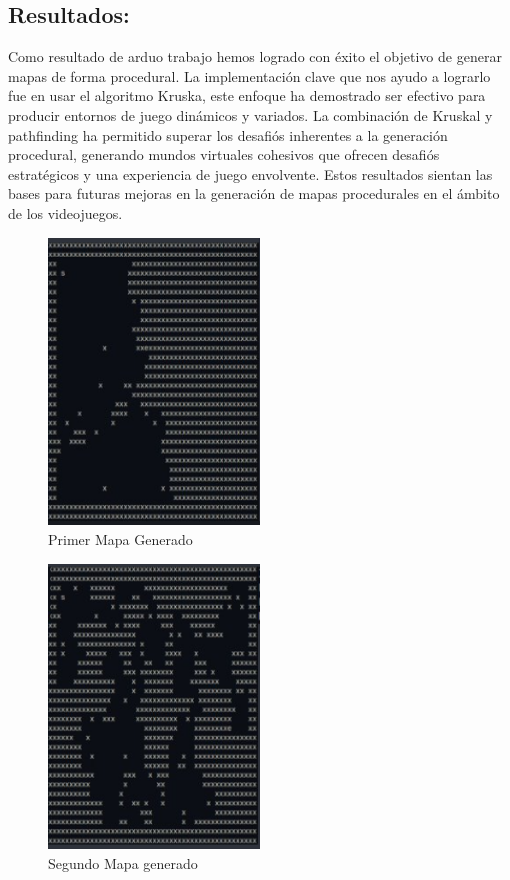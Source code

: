 \documentclass[stu, 12pt, letterpaper, donotrepeattitle, floatsintext, natbib]{apa7}
\begin{document}
\subsection{Resultados:}
Como resultado de arduo trabajo hemos logrado con éxito el objetivo de generar mapas de forma procedural. La implementación clave que nos ayudo a lograrlo fue en usar el algoritmo Kruska, este enfoque ha demostrado ser efectivo para producir entornos de juego dinámicos y variados. La combinación de Kruskal y pathfinding ha permitido superar los desafiós inherentes a la generación procedural, generando mundos virtuales cohesivos que ofrecen desafiós estratégicos y una experiencia de juego envolvente. Estos resultados sientan las bases para futuras mejoras en la generación de mapas procedurales en el ámbito de los videojuegos.
\begin{figure}
    \centering
    \includegraphics[width=0.5\textwidth]{mapa1.PNG}
    \caption{Primer Mapa Generado}
    \label{fig:enter-label}
\end{figure}
\begin{figure}
    \centering
    \includegraphics[width=0.5\textwidth]{mapa2.PNG}
    \caption{Segundo Mapa generado}
    \label{fig:enter-label}
\end{figure}
\end{document}
